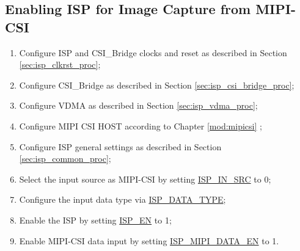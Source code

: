 \documentclass[main\_\_EN.tex]{subfiles}
\begin{document}
\subsection{Enabling ISP for Image Capture from MIPI-CSI}
\begin{enumerate}
    \item Configure ISP and CSI\_Bridge clocks and reset as described in Section \ref{sec:isp_clkrst_proc};

    \item Configure CSI\_Bridge as described in Section \ref{sec:isp_csi_bridge_proc};

    \item Configure VDMA as described in Section \ref{sec:isp_vdma_proc};

    \item Configure MIPI CSI HOST according to Chapter \ref{mod:mipicsi} \textit{};

    \item Configure ISP general settings as described in Section \ref{sec:isp_common_proc};

    \item Select the input source as MIPI-CSI by setting \hyperref[fielddesc:ISPINSRC]{ISP\_IN\_SRC} to 0;

    \item Configure the input data type via \hyperref[fielddesc:ISPDATATYPE]{ISP\_DATA\_TYPE};

    \item Enable the ISP by setting \hyperref[fielddesc:ISPEN]{ISP\_EN} to 1;

    \item Enable MIPI-CSI data input by setting \hyperref[fielddesc:ISPMIPIDATAEN]{ISP\_MIPI\_DATA\_EN} to 1.
\end{enumerate}
\end{document}
